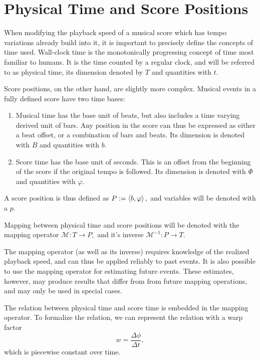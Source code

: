 \section{Physical Time and Score Positions}
\label{sec:meth:read_and_score_time}

When modifying the playback speed of a musical score
which has tempo variations already build into it,
it is important to precisely define the concepts of time used.
Wall-clock time is the monotonically progressing concept of time
most familiar to humans.
It is the time counted by a regular clock,
and will be referred to as physical time,
its dimension denoted by $T$ and quantities with $t$.

Score positions, on the other hand,
are slightly more complex.
Musical events in a fully defined score have two time bases:
\begin{enumerate}
\item Musical time has the base unit of beats, but also includes a time varying derived unit of bars. Any position in the score can thus be expressed as either a beat offset, or a combination of bars and beats. Its dimension is denoted with $B$ and quantities with $b$.
\item Score time has the base unit of seconds. This is an offset from the beginning of the score if the original tempo is followed. Its dimension is denoted with $\Phi$ and quantities with $\varphi$.
\end{enumerate}
A score position is thus defined as
$ P := \left \langle b, \varphi \right \rangle , $
and variables will be denoted with a $p$.

Mapping between physical time and score positions will be denoted with
the mapping operator
$ \mathcal{M} : T \rightarrow P, $
and it's inverse
$ \mathcal{M}^{-1} : P \rightarrow T. $

The mapping operator (as well as its inverse)
requires knowledge of
the realized playback speed,
and can thus be applied reliably to
past events.
It is also possible to use the mapping operator for
estimating future events.
These estimates, however,
may produce results that differ from
from future mapping operations,
and may only be used in special cases.

The relation between physical time and score time
is embedded in the mapping operator.
To formalize the relation, we can
represent the relation with a warp factor
\begin{equation}
w = \frac{\Delta \phi}{\Delta t},
\end{equation}
which is piecewise constant over time.

